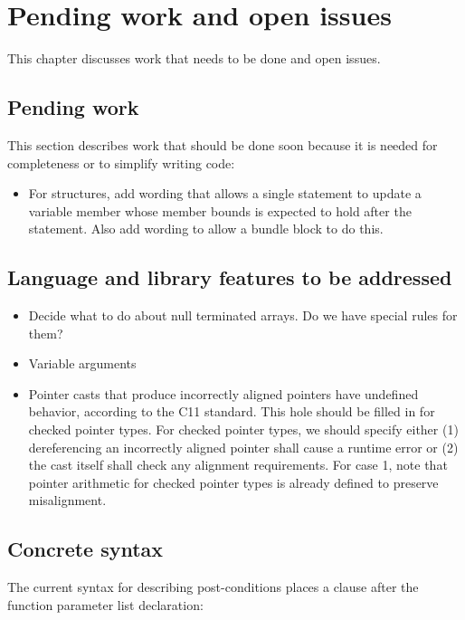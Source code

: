 
\chapter{Pending work and open issues}
\label{chapter:open-issues}

This chapter discusses work that needs to be done and open issues.

\section{Pending work}

This section describes work that should be done soon because it is
needed for completeness or to simplify writing code:
\begin{itemize}
\item For structures, add wording that allows a single statement  
to update a variable member whose member bounds is expected to hold after
the statement.  Also add wording to allow a bundle block to do this.
\end{itemize}

\section{Language and library features to be addressed}

\begin{itemize}
\item
  Decide what to do about null terminated arrays. Do we have special rules
  for them?
\item
  Variable arguments
\item
  Pointer casts that produce incorrectly aligned pointers have undefined
  behavior, according to the C11 standard. This hole should be filled in
  for checked pointer types. For checked pointer types, we should specify
  either (1) dereferencing an incorrectly aligned pointer shall cause a
  runtime error or (2) the cast itself shall check any alignment
  requirements. For case 1, note that pointer arithmetic for checked pointer types
  is already
  defined to preserve misalignment.
\end{itemize}

\section{Concrete syntax}
 
The current syntax for describing post-conditions places a 
clause after the function parameter list declaration:

